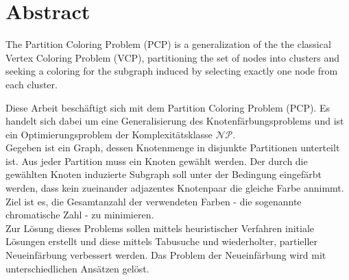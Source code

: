 \chapter*{Abstract}

The Partition Coloring Problem (PCP) is a generalization of the the classical Vertex Coloring Problem (VCP), partitioning the set of nodes into clusters and seeking a coloring for the subgraph induced by selecting exactly one node from each cluster.


Diese Arbeit beschäftigt sich mit dem Partition Coloring Problem (PCP). Es handelt sich dabei um eine Generalisierung des Knotenfärbungsproblems und ist ein Optimierungsproblem der Komplexitätsklasse $\mathcal{NP}$.\\
Gegeben ist ein Graph, dessen Knotenmenge in disjunkte Partitionen unterteilt ist. Aus jeder Partition muss ein Knoten gewählt werden. Der durch die gewählten Knoten induzierte Subgraph soll unter der Bedingung eingefärbt werden, dass kein zueinander adjazentes Knotenpaar die gleiche Farbe annimmt. Ziel ist es, die Gesamtanzahl der verwendeten Farben - die sogenannte chromatische Zahl - zu minimieren.\\
Zur Lösung dieses Problems sollen mittels heuristischer Verfahren initiale Lösun\-gen erstellt und diese mittels Tabusuche und wiederholter, partieller Neueinfär\-bung verbessert werden. Das Problem der Neueinfärbung wird mit unterschiedlichen Ansätzen gelöst. 
